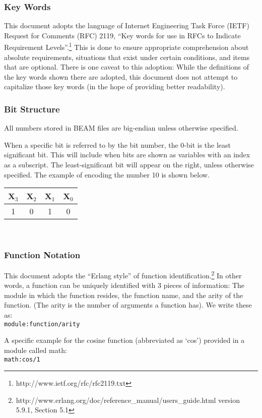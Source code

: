 \documentclass{article}
\begin{document}
\subsubsection{Key Words}
This document adopts the language of Internet Engineering Task Force (IETF)
Request for Comments (RFC) 2119,
``Key words for use in RFCs to Indicate Requirement
Levels''.\footnote{http://www.ietf.org/rfc/rfc2119.txt}  
This is done to ensure appropriate comprehension about absolute requirements,
situations that exist under certain conditions, and items that are optional.
There is one caveat to this adoption: While the definitions of the key words
shown there are adopted, this document does not attempt to capitalize those
key words (in the hope of providing better readability).

\subsubsection{Bit Structure}
All numbers stored in BEAM files are big-endian unless
otherwise specified.  

When a specific bit is referred to by the bit number, the 0-bit is the least
significant bit.  This will include when bits are shown as variables with an
index as a subscript.  The least-significant bit will appear on the right, unless
otherwise specified.  The example of encoding the number 10 is shown below.
\begin{tabular}{ |c|c|c|c| } \hline
X$_3$ &X$_2$ &X$_1$ &X$_0$  \\ \hline
1     &  0   &   1  &  0  \\ \hline
\end{tabular}\\

\subsubsection{Function Notation}
This document adopts the ``Erlang style'' of function
identification.\footnote{http://www.erlang.org/doc/reference\_manual/users\_guide.html
version 5.9.1, Section 5.1}  In other words, 
a function can be uniquely identified with 3 pieces of information: The module 
in which the function resides, the function name, and the arity of the function.  (The arity
is the number of arguments a function has).  We write these as: \\
\texttt{module:function/arity}

A specific example for the cosine function (abbreviated as `cos') provided in a
module called math:\\
\texttt{math:cos/1}
\end{document}
